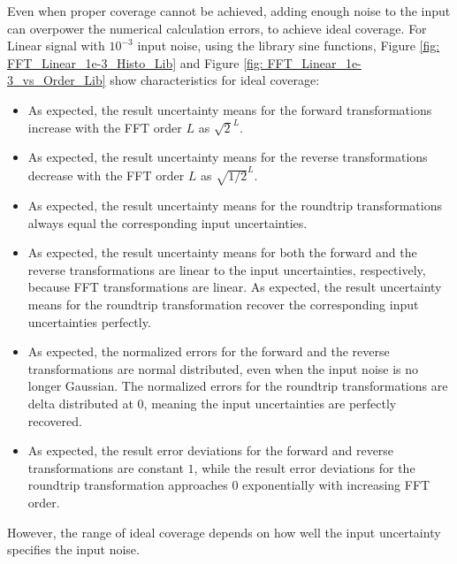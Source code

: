 \documentclass[twoside]{article}
\numberwithin{equation}{section}
\begin{document}
Even when proper coverage cannot be achieved, adding enough noise to the input can overpower the numerical calculation errors, to achieve ideal coverage.
For Linear signal with $10^{-3}$ input noise, using the library sine functions, Figure \ref{fig: FFT_Linear_1e-3_Histo_Lib} and Figure \ref{fig:  FFT_Linear_1e-3_vs_Order_Lib} show characteristics for ideal coverage:  
\begin{itemize}
\item As expected, the result uncertainty means for the forward transformations increase with the FFT order $L$ as $\sqrt{2}^L$.

\item As expected, the result uncertainty means for the reverse transformations decrease with the FFT order $L$ as $\sqrt{1/2}^L$.

\item As expected, the result uncertainty means for the roundtrip transformations always equal the corresponding input uncertainties.

\item As expected, the result uncertainty means for both the forward and the reverse transformations are linear to the input uncertainties, respectively, because FFT transformations are linear.
As expected, the result uncertainty means for the roundtrip transformation recover the corresponding input uncertainties perfectly.

\item As expected, the normalized errors for the forward and the reverse transformations are normal distributed, even when the input noise is no longer Gaussian.
The normalized errors for the roundtrip transformations are delta distributed at $0$, meaning the input uncertainties are perfectly recovered.

\item As expected, the result error deviations for the forward and reverse transformations are constant $1$, while the result error deviations for the roundtrip transformation approaches $0$ exponentially with increasing FFT order.

\end{itemize}

However, the range of ideal coverage depends on how well the input uncertainty specifies the input noise.  
\end{document}
